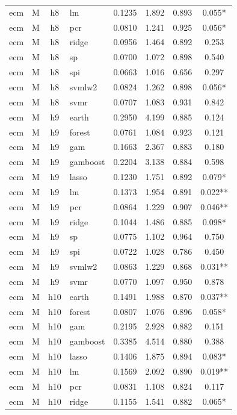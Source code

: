 \begin{ThreePartTable}
\begin{longtable}[t]{llclcccc}
ecm & M & h8 & lm & 0.1235 & 1.892 & 0.893 & 0.055*\\
ecm & M & h8 & pcr & 0.0810 & 1.241 & 0.925 & 0.056*\\
ecm & M & h8 & ridge & 0.0956 & 1.464 & 0.892 & 0.253\\
ecm & M & h8 & sp & 0.0700 & 1.072 & 0.898 & 0.540\\
ecm & M & h8 & spi & 0.0663 & 1.016 & 0.656 & 0.297\\
ecm & M & h8 & svmlw2 & 0.0824 & 1.262 & 0.898 & 0.056*\\
ecm & M & h8 & svmr & 0.0707 & 1.083 & 0.931 & 0.842\\
\addlinespace
ecm & M & h9 & earth & 0.2950 & 4.199 & 0.885 & 0.124\\
ecm & M & h9 & forest & 0.0761 & 1.084 & 0.923 & 0.121\\
ecm & M & h9 & gam & 0.1663 & 2.367 & 0.883 & 0.180\\
ecm & M & h9 & gamboost & 0.2204 & 3.138 & 0.884 & 0.598\\
ecm & M & h9 & lasso & 0.1230 & 1.751 & 0.892 & 0.079*\\
ecm & M & h9 & lm & 0.1373 & 1.954 & 0.891 & 0.022**\\
ecm & M & h9 & pcr & 0.0864 & 1.229 & 0.907 & 0.046**\\
ecm & M & h9 & ridge & 0.1044 & 1.486 & 0.885 & 0.098*\\
ecm & M & h9 & sp & 0.0775 & 1.102 & 0.964 & 0.750\\
ecm & M & h9 & spi & 0.0722 & 1.028 & 0.786 & 0.450\\
ecm & M & h9 & svmlw2 & 0.0863 & 1.229 & 0.868 & 0.031**\\
ecm & M & h9 & svmr & 0.0770 & 1.097 & 0.950 & 0.878\\
\addlinespace
ecm & M & h10 & earth & 0.1491 & 1.988 & 0.870 & 0.037**\\
ecm & M & h10 & forest & 0.0807 & 1.076 & 0.896 & 0.058*\\
ecm & M & h10 & gam & 0.2195 & 2.928 & 0.882 & 0.151\\
ecm & M & h10 & gamboost & 0.3385 & 4.514 & 0.880 & 0.388\\
ecm & M & h10 & lasso & 0.1406 & 1.875 & 0.894 & 0.083*\\
ecm & M & h10 & lm & 0.1569 & 2.092 & 0.890 & 0.019**\\
ecm & M & h10 & pcr & 0.0831 & 1.108 & 0.824 & 0.117\\
ecm & M & h10 & ridge & 0.1155 & 1.541 & 0.882 & 0.065*\\

\end{longtable}
\end{ThreePartTable}
